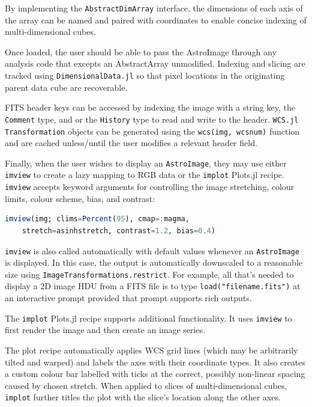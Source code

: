 \documentclass{juliacon}
\begin{document}
By implementing the \verb|AbstractDimArray| interface, the dimensions of each axis of the array can be named and paired with coordinates to enable concise indexing of multi-dimensional cubes.

Once loaded, the user should be able to pass the AstroImage through any analysis code that excepts an AbstractArray unmodified. Indexing and slicing are tracked using \verb|DimensionalData.jl| so that pixel locations in the originating parent data cube are recoverable.

FITS header keys can be accessed by indexing the image with a string key, the \verb|Comment| type, and or the \verb|History| type to read and write to the header. \verb|WCS.jl| \verb|Transformation| objects can be generated using the \verb|wcs(img, wcsnum)| function and are cached unless/until the user modifies a relevant header field.

Finally, when the user wishes to display an \verb|AstroImage|, they may use either 
\verb|imview| to create a lazy mapping to RGB data or the \verb|implot| Plots.jl recipe. 
\verb|imview| accepts keyword arguments for controlling the image stretching, colour limits, colour scheme, bias, and contrast:

\begin{lstlisting}[language = Julia]
imview(img; clims=Percent(95), cmap=:magma,
    stretch=asinhstretch, contrast=1.2, bias=0.4)
\end{lstlisting}


\verb|imview| is also called automatically with default values whenever an \verb|AstroImage| is displayed.
In this case, the output is automatically downscaled to a reasonable size using \verb|ImageTransformations.restrict|.
For example, all that's needed to display a 2D image HDU from a FITS file is to type \verb|load("filename.fits")| at an interactive prompt provided that prompt supports rich outputs.

The \verb|implot| Plots.jl recipe supports additional functionality. It uses \verb|imview| to first render the image and then create an image series.

The plot recipe automatically applies WCS grid lines (which may be arbitrarily tilted and warped) and labels the axes with their coordinate types. It also creates a custom colour bar labelled with ticks at the correct, possibly non-linear spacing caused by chosen stretch.
When applied to slices of multi-dimensional cubes, \verb|implot| further titles the plot with the slice's location along the other axes.
\end{document}
